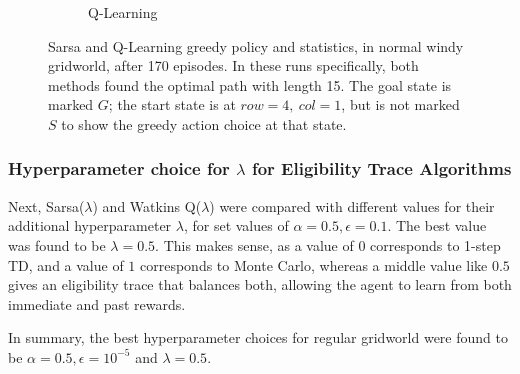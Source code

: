 \documentclass{article}
\begin{document}
\begin{figure}[h!]
\begin{subfigure}{0.4\textwidth}
    \caption{Q-Learning}
  \end{subfigure}
  \caption{Sarsa and Q-Learning greedy policy and statistics, in normal windy gridworld, after 170 episodes. In these runs specifically, both methods found the optimal path with length 15. The goal state is marked $G$; the start state is at $row=4,\ col=1$, but is not marked $S$ to show the greedy action choice at that state.}
  \label{fig:regular_example}
\end{figure}

\subsubsection{Hyperparameter choice for $\lambda$ for Eligibility Trace Algorithms}

Next, Sarsa($\lambda$) and Watkins Q($\lambda$) were compared with different values for their additional hyperparameter $\lambda$, for set values of $\alpha = 0.5, \epsilon = 0.1$. The best value was found to be $\lambda=0.5$. This makes sense, as a value of $0$ corresponds to 1-step TD, and a value of $1$ corresponds to Monte Carlo, whereas a middle value like $0.5$ gives an eligibility trace that balances both, allowing the agent to learn from both immediate and past rewards.

In summary, the best hyperparameter choices for regular gridworld were found to be $\alpha = 0.5, \epsilon = 10^{-5}$ and $\lambda=0.5$.
\end{document}
